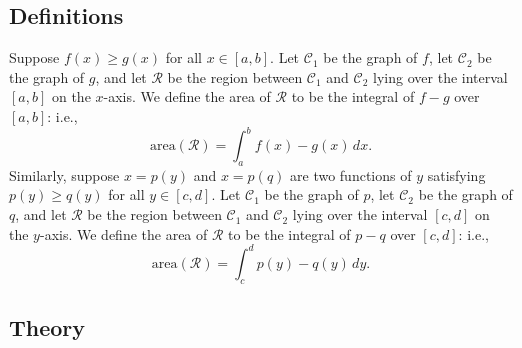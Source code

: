 \subsection*{Definitions}
\begin{namedtheorem} Suppose $f(x)\geq g(x)$ for all $x\in [a,b]$. Let $\mathcal{C}_1$ be the graph of $f$, let $\mathcal{C}_2$ be the graph of $g$, and let $\mathcal{R}$ be the region between $\mathcal{C}_1$ and $\mathcal{C}_2$ lying over the interval $[a,b]$ on the $x$-axis. We define the area of $\mathcal{R}$ to be the integral of $f-g$ over $[a,b]$: i.e.,
  \[
  \text{area}(\mathcal{R})=\int_a^b f(x)-g(x)\, dx.
  \]
Similarly, suppose $x=p(y)$ and $x=p(q)$ are two functions of $y$ satisfying $p(y)\geq q(y)$ for all $y\in [c,d]$. Let $\mathcal{C}_1$ be the graph of $p$, let $\mathcal{C}_2$ be the graph of $q$, and let $\mathcal{R}$ be the region between $\mathcal{C}_1$ and $\mathcal{C}_2$ lying over the interval $[c,d]$ on the $y$-axis. We define the area of $\mathcal{R}$ to be the integral of $p-q$ over $[c,d]$: i.e.,
  \[
  \text{area}(\mathcal{R})=\int_c^d p(y)-q(y)\, dy.
  \]
\end{namedtheorem}
\begin{comment}
Observe that the definition only applies when $f(x)\geq g(x)$ for all $x$ in the given interval. This ensures that the area of $\mathcal{R}$, as defined, is at least nonnegative.
\end{comment}
 \subsection*{Theory}

